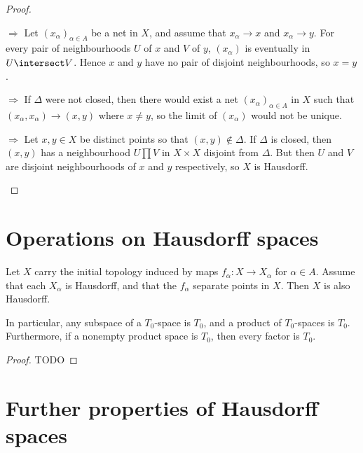 \documentclass[article, a4paper, 11pt, oneside]{memoir}
\numberwithin{equation}{chapter}
\renewcommand{\implies}{\Rightarrow}
\begin{document}
\begin{proof}
\begin{proofsec}
    \item[\subcref{enum:T2-space} $\implies$ \subcref{enum:T2-limits_unique}]
    Let $(x_\alpha)_{\alpha \in A}$ be a net in $X$, and assume that $x_\alpha \to x$ and $x_\alpha \to y$. For every pair of neighbourhoods $U$ of $x$ and $V$ of $y$, $(x_\alpha)$ is eventually in $U \intersect V$. Hence $x$ and $y$ have no pair of disjoint neighbourhoods, so $x = y$.

    \item[\subcref{enum:T2-limits_unique} $\implies$ \subcref{enum:T2-closed_diagonal}]
    If $\Delta$ were not closed, then there would exist a net $(x_\alpha)_{\alpha \in A}$ in $X$ such that $(x_\alpha, x_\alpha) \to (x,y)$ where $x \neq y$, so the limit of $(x_\alpha)$ would not be unique.

    \item[\subcref{enum:T2-closed_diagonal} $\implies$ \subcref{enum:T2-space}]
    Let $x,y \in X$ be distinct points so that $(x,y) \not\in \Delta$. If $\Delta$ is closed, then $(x,y)$ has a neighbourhood $U \prod V$ in $X \times X$ disjoint from $\Delta$. But then $U$ and $V$ are disjoint neighbourhoods of $x$ and $y$ respectively, so $X$ is Hausdorff.
\end{proofsec}
\end{proof}


\section{Operations on Hausdorff spaces}

\begin{proposition} %
    Let $X$ carry the initial topology induced by maps $f_\alpha \colon X \to X_\alpha$ for $\alpha \in A$. Assume that each $X_\alpha$ is Hausdorff, and that the $f_\alpha$ separate points in $X$. Then $X$ is also Hausdorff.

    In particular, any subspace of a $T_0$-space is $T_0$, and a product of $T_0$-spaces is $T_0$. Furthermore, if a nonempty product space is $T_0$, then every factor is $T_0$.
\end{proposition}

\begin{proof}
    TODO
\end{proof}


\section{Further properties of Hausdorff spaces}
\end{document}
